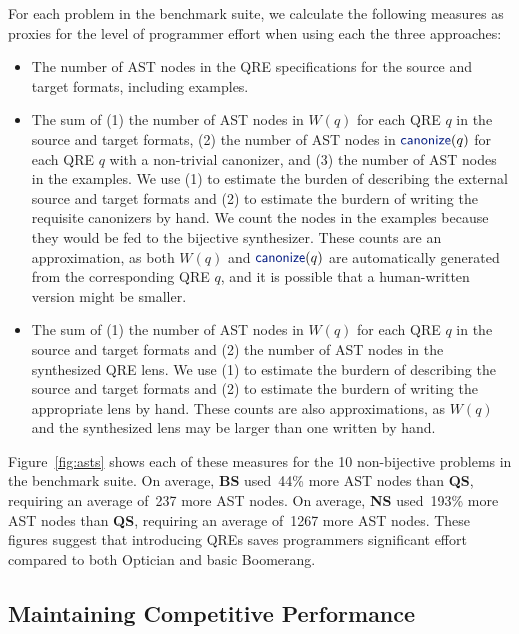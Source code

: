 \documentclass[acmsmall,review,anonymous]{acmart}
\newcommand{\kw}[1]{\textcolor{dkblue}{\ensuremath{\mathsf{#1}}}}
\newcommand{\canonize}{\ensuremath{\kw{canonize}}}
\newcommand{\QRESize}{\textbf{QS}}
\newcommand{\canonizeAndSpecSize}{\textbf{BS}}
\newcommand{\LensAndSpecSize}{\textbf{NS}}
\begin{document}
For each problem in the benchmark suite, we calculate the following
measures as proxies for the level of programmer effort when using each
the three approaches:

%
\begin{itemize}
  \item[\QRESize{}:] 
  The number of AST nodes in the QRE specifications for the source and
  target formats, including examples. 
  \item[\canonizeAndSpecSize{}:] 
  The sum of (1) the number of AST nodes in $W(q)$ for each QRE $q$ in the source and target
  formats, (2) the number of AST nodes in $\canonize(q)$ for each QRE $q$ with a
  non-trivial canonizer, and (3) the number of AST nodes in the
  examples.  We use (1) to estimate the burden of describing
  the external source and target formats and (2) to estimate the
  burdern of writing the requisite canonizers
  by hand.  We count the nodes in the examples because they would be
  fed to the bijective synthesizer.  
  These counts are an approximation, as both $W(q)$ and $\canonize(q)$ are
  automatically generated from the corresponding QRE $q$, and it is
  possible that a human-written version might be smaller.
  \item[\LensAndSpecSize{}:] The sum of (1) the number of AST nodes in
  $W(q)$ for each QRE $q$ in the source and target formats and (2) the
  number of AST nodes in the synthesized QRE lens.  We use (1) to
  estimate the burdern of describing the source and target formats
  and (2) to estimate the burdern of writing the appropriate lens by
  hand. These counts are also approximations, as
  $W(q)$ and the synthesized lens may be larger than one written by hand.
\end{itemize}

Figure~\ref{fig:asts} shows each of these measures for the 10
non-bijective problems in the benchmark suite.  On
average, \canonizeAndSpecSize{} used~44\% more AST nodes
than \QRESize{}, requiring an average of~237 more AST nodes. On 
average, \LensAndSpecSize{} used~193\% more AST nodes than \QRESize{}, requiring an
average of~1267 more AST nodes. These figures suggest that introducing QREs saves
programmers significant effort compared to both Optician and basic
Boomerang.

\subsection{Maintaining Competitive Performance}
\end{document}
